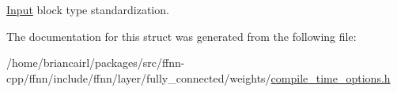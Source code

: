 \hyperlink{classffnn_1_1layer_1_1_input}{Input} block type standardization. 



The documentation for this struct was generated from the following file\-:\begin{DoxyCompactItemize}
\item 
/home/briancairl/packages/src/ffnn-\/cpp/ffnn/include/ffnn/layer/fully\-\_\-connected/weights/\hyperlink{fully__connected_2weights_2compile__time__options_8h}{compile\-\_\-time\-\_\-options.\-h}\end{DoxyCompactItemize}
